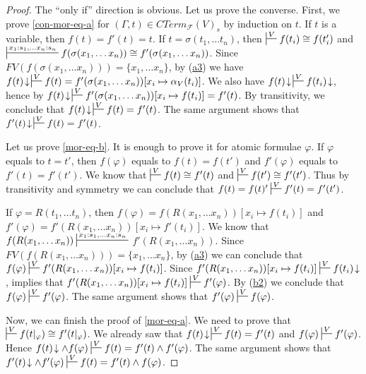 \documentclass[reqno]{amsart}
\newcommand{\axref}[1]{(\hyperref[ax:#1]{#1})}
\theoremstyle{definition}
\theoremstyle{remark}
\numberwithin{figure}{section}
\begin{document}
\begin{proof}
The ``only if'' direction is obvious.
Let us prove the converse.
First, we prove \eqref{con-mor-eq-a} for $(\Gamma,t) \in CTerm_\mathcal{F}(V)_s$ by induction on $t$.
If $t$ is a variable, then $f(t) = f'(t) = t$.
If $t = \sigma(t_1, \ldots t_n)$, then $\sststile{}{V} f(t_i) \cong f(t'_i)$
and $\sststile{}{x_1 : s_1, \ldots x_n : s_n} f(\sigma(x_1, \ldots x_n)) \cong f'(\sigma(x_1, \ldots x_n))$.
Since $FV(f(\sigma(x_1, \ldots x_n))) = \{ x_1, \ldots x_n\}$, by \axref{a3} we have
$f(t)\!\downarrow\,\sststile{}{V} f(t) = f'(\sigma(x_1, \ldots x_n))[x_i \mapsto \alpha_V(t_i)]$.
We also have $f(t)\!\downarrow\,\sststile{}{V} f(t_i)\!\downarrow$, hence by 
$f(t)\!\downarrow\,\sststile{}{V} f'(\sigma(x_1, \ldots x_n))[x_i \mapsto f(t_i)] = f'(t)$.
By transitivity, we conclude that $f(t)\!\downarrow\,\sststile{}{V} f(t) = f'(t)$.
The same argument shows that $f'(t)\!\downarrow\,\sststile{}{V} f(t) = f'(t)$.

Let us prove \eqref{mor-eq-b}.
It is enough to prove it for atomic formulae $\varphi$.
If $\varphi$ equals to $t = t'$, then $f(\varphi)$ equals to $f(t) = f(t')$ and $f'(\varphi)$ equals to $f'(t) = f'(t')$.
We know that $\sststile{}{V} f(t) \cong f'(t)$ and $\sststile{}{V} f(t') \cong f'(t')$.
Thus by transitivity and symmetry we can conclude that $f(t) = f(t)' \sststile{}{V} f'(t) = f'(t')$.

If $\varphi = R(t_1, \ldots t_n)$, then $f(\varphi) = f(R(x_1, \ldots x_n))[x_i \mapsto f(t_i)]$
and $f'(\varphi) = f'(R(x_1, \ldots x_n))[x_i \mapsto f'(t_i)]$.
We know that $f(R(x_1, \ldots x_n)) \sststile{}{x_1 : s_1, \ldots x_n : s_n}$ \linebreak $f'(R(x_1, \ldots x_n))$.
Since $FV(f(R(x_1, \ldots x_n))) = \{ x_1, \ldots x_n \}$, by \axref{a3} we can conclude that $f(\varphi) \sststile{}{V} f'(R(x_1, \ldots x_n))[x_i \mapsto f(t_i)]$.
Since $f'(R(x_1, \ldots x_n))[x_i \mapsto f(t_i)] \sststile{}{V} f(t_i)\!\downarrow$,  implies that
$f'(R(x_1, \ldots x_n))[x_i \mapsto f(t_i)] \sststile{}{V} f'(\varphi)$.
By \axref{b2} we conclude that $f(\varphi) \sststile{}{V} f'(\varphi)$.
The same argument shows that $f'(\varphi) \sststile{}{V} f(\varphi)$.

Now, we can finish the proof of \eqref{mor-eq-a}.
We need to prove that $\sststile{}{V} f(t|_\varphi) \cong f'(t|_\varphi)$.
We already saw that $f(t)\!\downarrow\,\sststile{}{V} f(t) = f'(t)$ and $f(\varphi) \sststile{}{V} f'(\varphi)$.
Hence $f(t)\!\downarrow \land f(\varphi) \sststile{}{V} f(t) = f'(t) \land f'(\varphi)$.
The same argument shows that $f'(t)\!\downarrow \land f'(\varphi) \sststile{}{V} f(t) = f'(t) \land f(\varphi)$.
\end{proof}
\end{document}
